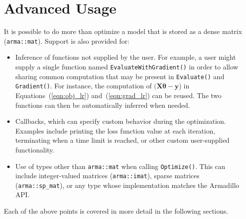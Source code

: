 \section{Advanced Usage}

It is possible to do more than optimize a model that is stored as 
a dense matrix ({\tt arma::mat}).  Support is also provided for:

\begin{itemize}

\item
Inference of functions not supplied by the user.
For example, a user might supply a single function named
{\tt EvaluateWithGradient()}
in order to allow sharing common computation that may be 
present in {\tt Evaluate()} and {\tt Gradient()}.
For instance, the computation of $(\bm X \bm \theta - \bm y$)
in Equations~(\ref{eqn:obj_lr}) and~(\ref{eqn:grad_lr}) can be reused.
The two functions can then be automatically inferred when needed.

\item
Callbacks, which can specify custom behavior during the optimization.
Examples include printing the loss function value at each iteration,
terminating when a time limit is reached,
or other custom user-supplied functionality.

\item
Use of types other than {\tt arma::mat} when calling {\tt Optimize()}.
This can include
integer-valued matrices ({\tt arma::imat}),
sparse matrices ({\tt arma::sp\_mat}),
or any type whose implementation matches the Armadillo API.



\end{itemize}

Each of the above points is covered in more detail
in the following sections.


